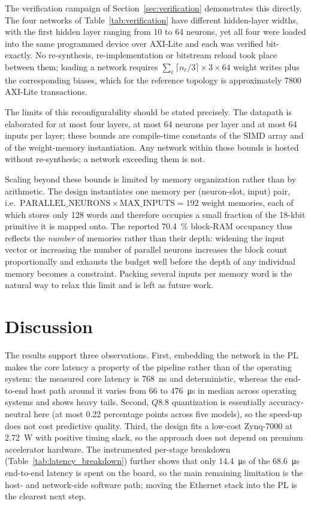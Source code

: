 \documentclass[final,5p,times,twocolumn]{elsarticle}
\begin{document}
The verification campaign of Section~\ref{sec:verification} demonstrates this
directly. The four networks of Table~\ref{tab:verification} have different
hidden-layer widths, with the first hidden layer ranging from 10 to 64 neurons,
yet all four were loaded into the same programmed device over AXI-Lite and each
was verified bit-exactly. No re-synthesis, re-implementation or bitstream
reload took place between them; loading a network requires
$\sum_{\ell}\lceil n_\ell/3\rceil \times 3 \times 64$ weight writes plus the
corresponding biases, which for the reference topology is approximately
\num{7800} AXI-Lite transactions.

The limits of this reconfigurability should be stated precisely. The datapath is
elaborated for at most four layers, at most 64 neurons per layer and at most 64
inputs per layer; these bounds are compile-time constants of the SIMD array and
of the weight-memory instantiation. Any network within those bounds is hosted
without re-synthesis; a network exceeding them is not.

Scaling beyond these bounds is limited by memory organization rather than by
arithmetic. The design instantiates one memory per (neuron-slot, input) pair,
i.e.\ $\mathrm{PARALLEL\_NEURONS} \times \mathrm{MAX\_INPUTS} = 192$ weight
memories, each of which stores only 128 words and therefore occupies a small
fraction of the 18-kbit primitive it is mapped onto. The reported
\SI{70.4}{\percent} block-RAM occupancy thus reflects the \emph{number} of
memories rather than their depth: widening the input vector or increasing the
number of parallel neurons increases the block count proportionally and
exhausts the budget well before the depth of any individual memory becomes a
constraint. Packing several inputs per memory word is the natural way to relax
this limit and is left as future work.

\section{Discussion}
The results support three observations. First, embedding the network in the PL
makes the core latency a property of the pipeline rather than of the operating
system: the measured core latency is \SI{768}{\nano\second} and deterministic,
whereas the end-to-end host path around it varies from \SI{66}{} to
\SI{476}{\micro\second} in median across operating systems and shows heavy tails. Second, $Q8.8$ quantization is essentially
accuracy-neutral here (at most 0.22 percentage points across five models), so
the speed-up does not cost predictive quality. Third, the design fits a low-cost Zynq-7000 at \SI{2.72}{\watt} with
positive timing slack, so the approach does not depend on premium accelerator
hardware. The instrumented per-stage breakdown
(Table~\ref{tab:latency_breakdown}) further shows that only
\SI{14.4}{\micro\second} of the \SI{68.6}{\micro\second} end-to-end latency is
spent on the board, so the main remaining limitation is the host- and
network-side software path; moving the Ethernet stack into the PL is the clearest
next step.
\end{document}
